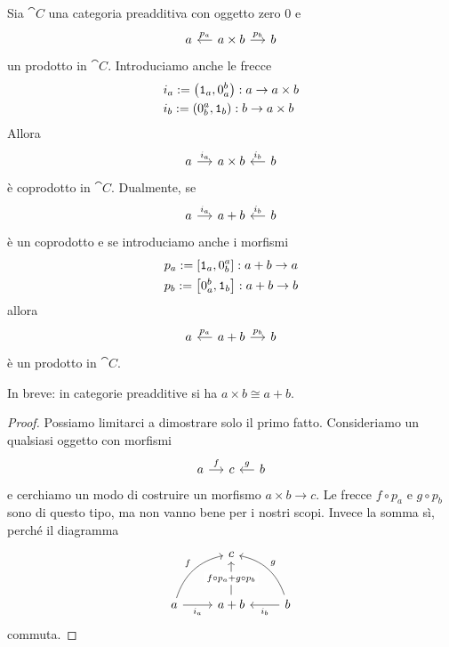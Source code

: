 \begin{proposition}\label{proposition:BinProdsAreBinCoprods}
  Sia \(\cat C\) una categoria preadditiva con oggetto zero \(0\) e
  \[
    \begin{tikzcd}[column sep=small]
      a & a \times b \ar["{p_a}", l, swap] \ar["{p_b}", r] & b
    \end{tikzcd}
  \]
  un prodotto in \(\cat C\).  Introduciamo anche le frecce
  \begin{equation}
    \label{eq:InjViaProj}
    \begin{aligned}
      & i_a := \left( \mathtt 1_a, 0_a^b \right) : a \to a \times b \\
      & i_b := \left( 0_b^a, \mathtt 1_b \right) : b \to a \times b
    \end{aligned}
  \end{equation}
  Allora
  \[
    \begin{tikzcd}[column sep=small]
      a \ar["{i_a}", r] & a \times b & b \ar["{i_b}", l, swap]
    \end{tikzcd}
  \]
  è coprodotto in \(\cat C\). Dualmente, se
  \[
    \begin{tikzcd}[column sep=small]
      a \ar["{i_a}", r] & a + b & b \ar["{i_b}", l, swap]
    \end{tikzcd}
  \]
  è un coprodotto e se introduciamo anche i morfismi
  \begin{equation}
    \label{eq:ProjViaInj}
    \begin{aligned}
      & p_a := \left[ \mathtt 1_a, 0_b^a \right] : a + b \to a \\
      & p_b := \left[ 0_a^b, \mathtt 1_b \right] : a + b \to b
    \end{aligned}
  \end{equation}
  allora
  \[
    \begin{tikzcd}[column sep=small]
      a & a + b \ar["{p_a}", l, swap] \ar["{p_b}", r] & b
    \end{tikzcd}
  \]
  è un prodotto in \(\cat C\).
\end{proposition}

In breve: in categorie preadditive si ha \(a \times b \cong a+b\).

\begin{proof}
  Possiamo limitarci a dimostrare solo il primo fatto. Consideriamo un
  qualsiasi oggetto con morfismi
  \[
    \begin{tikzcd}[column sep=small]
      a \ar["f", r] & c & b \ar["g", l, swap]
    \end{tikzcd}
  \]
  e cerchiamo un modo di costruire un morfismo \(a \times b \to c\). Le
  frecce \(f \circ p_a\) e \(g \circ p_b\) sono di questo tipo, ma non vanno
  bene per i nostri scopi. Invece la somma sì, perché il diagramma
  \[
    \begin{tikzcd}[row sep=large]
      & c \\
      a \ar["{i_a}", r, swap] \ar["f", ur, bend left] & a + b \ar["{f \circ p_a + g \circ
        p_b}" description, u] & b
      \ar["{i_b}", l] \ar["g", ul, bend right, swap]
    \end{tikzcd}
  \]
  commuta.
\end{proof}

